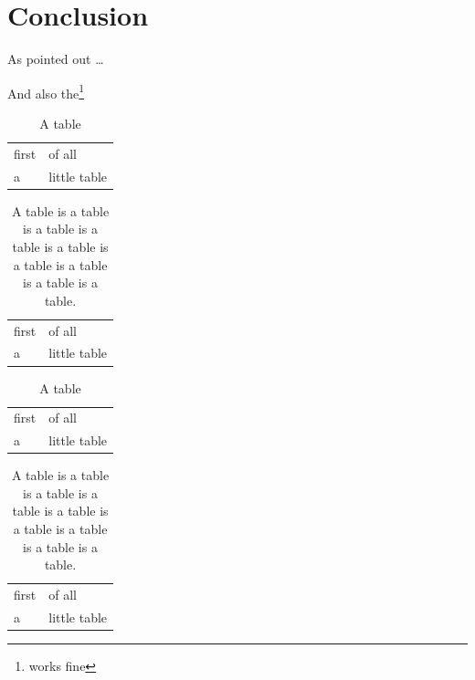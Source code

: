 \documentclass[10pt]{thesis}
\begin{document}
\mainmatter

\chapter{Conclusion}
\label{Chap:Conclusion}

As pointed out \dots 

And also the\footnote{works fine}

\begin{table}[!htb]
  \centering
    \begin{tabular}{ll}
      first & of all       \\
      a     & little table \\
    \end{tabular}
    \caption{A table}
    \label{tab:mytab}
\end{table}

\begin{table}[!htb]
  \centering
    \begin{tabular}{ll}
      first & of all       \\
      a     & little table \\
    \end{tabular}
    \caption{A table is a table is a table is a table is a table is a table is a table is a table is a table.}
    \label{tab:mytab2}
\end{table}

\captionsetup{labelfont=,textfont=,labelformat=simple}

\begin{table}[!htb]
  \centering
    \begin{tabular}{ll}
      first & of all       \\
      a     & little table \\
    \end{tabular}
    \caption{A table}
    \label{tab:mytab3}
\end{table}

\begin{table}[!htb]
  \centering
    \begin{tabular}{ll}
      first & of all       \\
      a     & little table \\
    \end{tabular}
    \caption{A table is a table is a table is a table is a table is a table is a table is a table is a table.}
    \label{tab:mytab4}
\end{table}
\end{document}
